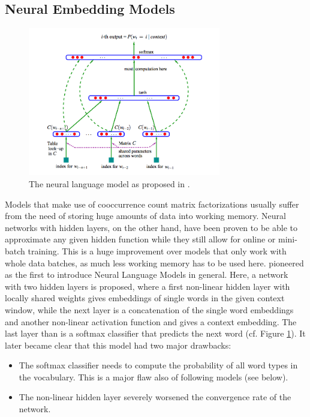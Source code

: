 \documentclass[11pt]{article}
\begin{document}
\subsection{Neural Embedding Models}
\begin{figure}[t]
\centering
\includegraphics[width=0.75\textwidth]{bengio2006network}
\caption{The neural language model as proposed in \cite{bengio2003neural}.}
\label{fig:bengio2006network}
\end{figure}
Models that make use of  cooccurrence count matrix factorizations usually suffer from the need of storing huge amounts of data into working memory. Neural networks with hidden layers, on the other hand, have been proven to be able to approximate any given hidden function while they still allow for online or mini-batch training. This is a huge improvement over models that only work with whole data batches, as much less working memory has to be used here. \cite{bengio2003neural} pioneered as the first to introduce Neural Language Models in general. Here, a network with two hidden layers is proposed, where a first non-linear hidden layer with locally shared weights gives embeddings of single words in the given context window, while the next layer is a concatenation of the single word embeddings and another non-linear activation function and gives a context embedding. The last layer than is a softmax classifier that predicts the next word (cf. Figure \ref{fig:bengio2006network}). 
It later became clear that this model had two major drawbacks:
\begin{itemize}  
\item The softmax classifier needs to compute the probability of all word types in the vocabulary. This is a major flaw also of following models (see below).
\item The non-linear hidden layer severely worsened the convergence rate of the network.
\end{itemize}
\end{document}

